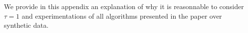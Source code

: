 \documentclass[a4paper,UKenglish,cleveref, autoref, thm-restate]{lipics-v2019}
\newcommand\pma{\textsc{pma}\xspace}
\begin{document}







\newpage
\appendix

\label{sec:appendix}

We provide in this appendix an explanation of why it is reasonnable to consider $\tau = 1$
and experimentations of all algorithms presented in the paper over synthetic data.
\end{document}

